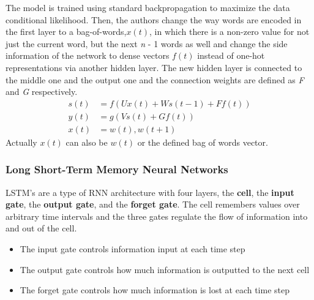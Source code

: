 \documentclass{scrartcl}
\begin{document}
    The  model is trained using standard backpropagation to maximize the data 
    conditional likelihood.
    Then, the authors change the way words are encoded in the first layer to a bag-of-words,$x(t)$,
    in which there is a non-zero value for not just the current word, 
    but the next \textit{n} - 1 words as well and change the side information 
    of the network to dense vectors $f(t)$ instead of one-hot representations 
    via another hidden layer. The new hidden layer is connected to the middle one and the 
    output one and the connection weights are defined as \textit{F} and \textit{G} respectively.
    \begin{align*}
        s(t) &= f(Ux(t) + Ws(t-1) + Ff(t)) \\
        y(t) &= g(Vs(t) + Gf(t)) \\
        x(t) &= {w(t), w(t + 1)}
    \end{align*}
    Actually $x(t)$ can also be $w(t)$ or the defined bag of words vector.
    \newpage
    \subsubsection{Long Short-Term Memory Neural Networks}
    LSTM's are a type of RNN architecture with four layers, the \textbf{cell}, 
    the \textbf{input gate}, the \textbf{output gate}, and the \textbf{forget gate}.
    The cell remembers values over arbitrary time intervals and the three 
    gates regulate the flow of information into and out of the cell. 
    \begin{itemize}
        \item The input gate controls information input at each time step
        \item The output gate controls how much information is outputted to the next cell
        \item The forget gate controls how much information is lost at each time step
    \end{itemize}
\end{document}
